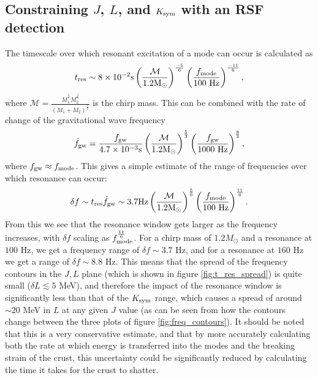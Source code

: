 \documentclass[fleqn,usenatbib]{mnras}
\begin{document}

















\subsection{Constraining $J$, $L$, and $K_{\rm sym}$ with an RSF detection}
\hspace{\parindent}The timescale over which resonant excitation of a mode can occur is calculated as \citet{tsang2012resonant}
\begin{align}
t_{\rm res}\sim 8\times10^{-2}\text{s}\left(\frac{\mathcal{M}}{1.2\text{M}_{\odot}}\right)^{\frac{-5}{6}}\left(\frac{f_{\rm mode}}{100 \text{ Hz}}\right)^{\frac{-11}{6}},
\label{res_timescale}    
\end{align}
\noindent where $\mathcal{M}=\frac{M_1^{\frac{3}{5}}M_2^{\frac{3}{5}}}{(M_1+M_2)^{\frac{1}{5}}}$ is the chirp mass. This can be combined with the rate of change of the gravitational wave frequency
\begin{align}
\Dot{f}_{\rm gw}=\frac{f_{\rm gw}}{4.7\times10^{-3}\text{s}}\left(\frac{\mathcal{M}}{1.2\text{M}_{\odot}}\right)^{\frac{5}{3}}\left(\frac{f_{\rm gw}}{1000 \text{ Hz}}\right)^{\frac{8}{3}},
\label{res_timescale}    
\end{align}
\noindent where $f_{\rm gw}\approx f_{\rm mode}$. This gives a simple estimate of the range of frequencies over which resonance can occur:
\begin{align}
\delta f\sim t_{\rm res}\Dot{f}_{\rm gw}\sim3.7\text{Hz}\left(\frac{\mathcal{M}}{1.2\text{M}_{\odot}}\right)^{\frac{5}{6}}\left(\frac{f_{\rm mode}}{100 \text{ Hz}}\right)^{\frac{11}{6}}.
\label{res_timescale}    
\end{align}
\noindent From this we see that the resonance window gets larger as the frequency increases, with $\delta f$ scaling as $f_{\rm mode}^{\frac{11}{6}}$. For a chirp mass of $1.2M_{\odot}$ and a resonance at $100$ Hz, we get a frequency range of $\delta f\sim 3.7$ Hz, and for a resonance at $160$ Hz we get a range of $\delta f\sim 8.8$ Hz. This means that the spread of the frequency contours in the $J,L$ plane (which is shown in figure \ref{fig:t_res_spread}) is quite small ($\delta L\lesssim 5$ MeV), and therefore the impact of the resonance window is significantly less than that of the $K_{\rm sym}$ range, which causes a spread of around $\sim 20$ MeV in $L$ at any given $J$ value (as can be seen from how the contours change between the three plots of figure \ref{fig:freq_contours}). It should be noted that this is a very conservative estimate, and that by more accurately calculating both the rate at which energy is transferred into the modes and the breaking strain of the crust, this uncertainty could be significantly reduced by calculating the time it takes for the crust to shatter.
\end{document}
